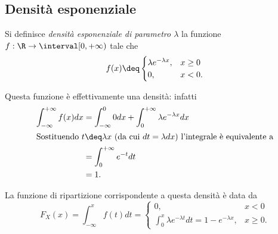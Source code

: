 \subsection{Densità esponenziale}
Si definisce \emph{densità esponenziale di parametro $\lambda$} la funzione $f : \R \to \interval[{0, +\infty})$ tale che \[
    f(x) \deq \begin{cases}
        \lambda e^{-\lambda x}, &x \geq 0\\
        0, &x < 0.
    \end{cases} 
\]

Questa funzione è effettivamente una densità: infatti \begin{align*}
    \int_{-\infty}^{+\infty} f(x)dx
    &= \int_{-\infty}^0 0dx + \int_0^{+\infty} \lambda e^{-\lambda x}dx\\
    \intertext{Sostituendo $t \deq \lambda x$ (da cui $dt = \lambda dx$) l'integrale è equivalente a}
    &= \int_0^{+\infty} e^{-t}dt\\
    &= 1.
\end{align*}

La funzione di ripartizione corrispondente a questa densità è data da \[
    F_X(x) = \int_{-\infty}^x f(t)dt = \begin{cases}
        0, &x < 0 \\[5pt]
        \displaystyle\int_0^x \lambda e^{-\lambda t}dt = 1 - e^{-\lambda x}, &x \geq 0.
    \end{cases}    
\]

